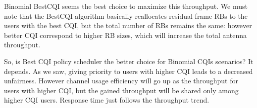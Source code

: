 Binomial BestCQI seems the best choice to maximize this throughput. We must note that the BestCQI algorithm basically reallocates residual frame RBs to the users with the best CQI, but the total number of RBs remains the same: however better CQI correspond to higher RB sizes, which will increase the total antenna throughput.

So, is Best CQI policy scheduler the better choice for Binomial CQIs scenarios? It depends. As we saw, giving priority to users with higher CQI leads to a decreased unfairness. However channel usage efficiency will go up as the throughput for users with higher CQI, but the gained throughput will be shared only among higher CQI users. Response time just follows the throughput trend.